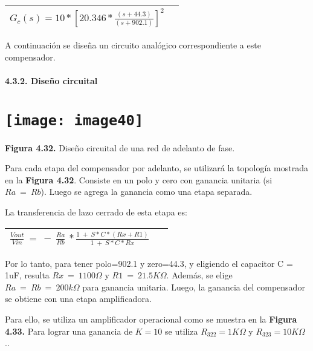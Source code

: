 \documentclass{article} %
\begin{document}
\noindent 

\begin{tabular}{|p{3.9in}|p{0.4in}|} \hline 
$G_c(s)=10*{[20.346*\frac{(s+44.3)}{(s+902.1)}]}^2$ &  \\ \hline 
\end{tabular}



\noindent A continuaci\'{o}n se dise\~{n}a un circuito anal\'{o}gico correspondiente a este compensador.

\noindent 
\paragraph{4.3.2. Dise\~{n}o circuital}

\noindent 
\section{\texttt{[image: image40]}}

\noindent \textbf{Figura 4.32. }Dise\~{n}o circuital de una red de adelanto de fase.

\noindent 

\noindent Para cada etapa del compensador por adelanto, se utilizar\'{a} la topolog\'{i}a mostrada en la \textbf{Figura 4.32}. Consiste en  un polo y cero con ganancia unitaria (si $Ra\ =\ Rb$). Luego se agrega la ganancia como una etapa separada.

\noindent 

\noindent La transferencia de lazo cerrado de esta etapa es:

\noindent 

\begin{tabular}{|p{3.9in}|p{0.4in}|} \hline 
$\frac{Vout}{Vin}\ =\ -\ \frac{Ra}{Rb}\ *\frac{1\ +\ S*C*(Rx+R1)}{1\ +\ S*C*Rx}\ \ $ &  \\ \hline 
\end{tabular}



\noindent Por lo tanto, para tener polo=902.1 y zero=44.3, y eligiendo el capacitor C = 1uF, resulta $Rx\ =\ 1100\mathit{\Omega}$ y $R1\ =\ 21.5K\mathit{\Omega}$. Adem\'{a}s, se elige $Ra\ =\ Rb\ =\ 200k\mathit{\Omega}$ para ganancia unitaria. Luego, la ganancia del compensador se obtiene con una etapa amplificadora.

\noindent Para ello, se utiliza un amplificador operacional como se muestra en la \textbf{Figura 4.33. }Para lograr una ganancia de $K=10$ se utiliza $R_{322}=1K\mathit{\Omega}$ y $R_{323}=10K\mathit{\Omega}$..
\end{document}
